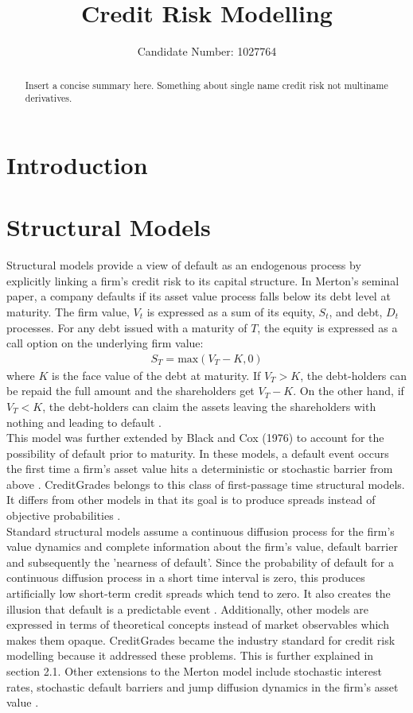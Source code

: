 \documentclass[11t,a4paper]{article}
\title{Credit Risk Modelling}
\author{Candidate Number: 1027764}
\begin{document}
\maketitle

\thispagestyle{empty}

\newpage
\tableofcontents
\thispagestyle{empty}
\newpage

\begin{abstract}
  Insert a concise summary here. Something about single name credit risk not multiname derivatives.
\end{abstract}
\newpage
\setcounter{page}{1}

\section{Introduction}
\section{Structural Models}
Structural models provide a view of default as an endogenous process by explicitly linking a firm's credit risk to its capital structure. In Merton's seminal paper, a company defaults if its asset value process falls below its debt level at maturity. The firm value, $V_t$ is expressed as a sum of its equity, $S_t$, and debt, $D_t$ processes. For any debt issued with a maturity of $T$, the equity is expressed as a call option on the underlying firm value:
\begin{align}
    S_T = \text{max}(V_T - K, 0)
\end{align}
where $K$ is the face value of the debt at maturity. If $V_T > K$, the debt-holders can be repaid the full amount and the shareholders get $V_T-K$. On the other hand, if $V_T<K$, the debt-holders can claim the assets leaving the shareholders with nothing and leading to default \cite{merton}. \\   
 This model was further extended by Black and Cox (1976) to account for the possibility of default prior to maturity. In these models, a default event occurs the first time a firm's asset value hits a deterministic or stochastic barrier from above \cite{Brigobook}.  CreditGrades belongs to this class of first-passage time structural models. It differs from other models in that its goal is to produce spreads instead of objective probabilities \cite{sfin}. \\
 Standard structural models assume a continuous diffusion process for the firm's value dynamics and complete information about the firm's value, default barrier and subsequently the 'nearness of default'. Since the probability of default for a continuous diffusion process in a short time interval is zero, this produces artificially low short-term credit spreads which tend to zero. It also creates the illusion that default is a predictable event \cite{asepp}. Additionally, other models are expressed in terms of theoretical concepts instead of market observables which makes them opaque. CreditGrades became the industry standard for credit risk modelling because it addressed these problems. This is further explained in section 2.1. Other extensions to the Merton model include stochastic interest rates, stochastic default barriers and jump diffusion dynamics in the firm's asset value \cite{levycg}.
\end{document}

